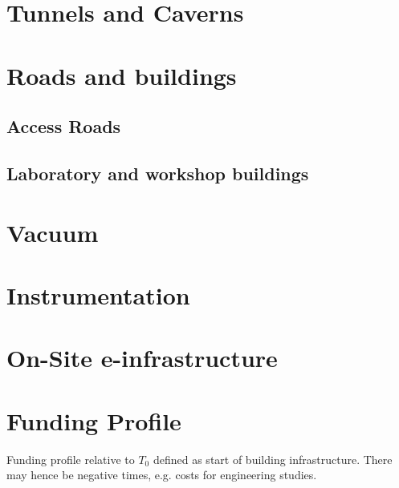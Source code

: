 
\label{part:Costing}
\chapter{Tunnels and Caverns}
\chapter{Roads and buildings}
\section{Access Roads}
\section{Laboratory and workshop buildings}
\chapter{Vacuum}
\chapter{Instrumentation}
\chapter{On-Site e-infrastructure}
\chapter{Funding Profile}
Funding profile relative to $T_0$ defined as start of building infrastructure. There may hence be negative times, e.g. costs for engineering studies.